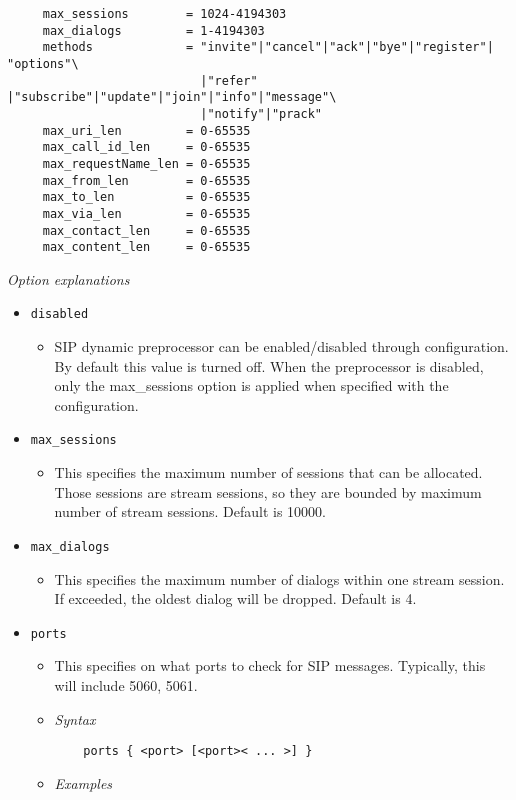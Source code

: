 \documentclass[english]{report}
\begin{document}
\footnotesize
\begin{verbatim}
     max_sessions        = 1024-4194303
     max_dialogs         = 1-4194303
     methods             = "invite"|"cancel"|"ack"|"bye"|"register"| "options"\
                           |"refer" |"subscribe"|"update"|"join"|"info"|"message"\                
                           |"notify"|"prack"
     max_uri_len         = 0-65535
     max_call_id_len     = 0-65535
     max_requestName_len = 0-65535
     max_from_len        = 0-65535
     max_to_len          = 0-65535
     max_via_len         = 0-65535
     max_contact_len     = 0-65535
     max_content_len     = 0-65535
\end{verbatim}
\normalsize
\textit{Option explanations}
\begin{itemize}
\item[] \texttt{disabled}
\begin{itemize}
\item[]  SIP dynamic preprocessor can be enabled/disabled through configuration. 
      By default this value is turned off. When the preprocessor is disabled, 
      only the max\_sessions option is applied when specified with the configuration.
\end{itemize}
\item[] \texttt{max\_sessions}
\begin{itemize}
\item[]  This specifies the maximum number of sessions that can be allocated. 
      Those sessions are stream sessions, so they are bounded by maximum number of 
      stream sessions. Default is 10000.
\end{itemize}
\item[] \texttt{max\_dialogs}
\begin{itemize}
\item[]   This specifies the maximum number of dialogs within one stream session. If exceeded,
      the oldest dialog will be dropped. Default is 4.
\end{itemize}
\item[] \texttt{ports}
\begin{itemize}
\item[]  This specifies on what ports to check for SIP messages. Typically, this will 
      include 5060, 5061.
\item[] \textit{Syntax}
\begin{verbatim}
    ports { <port> [<port>< ... >] }
\end{verbatim}
\item[] \textit{Examples}

\end{itemize}
\end{itemize}
\end{document}
